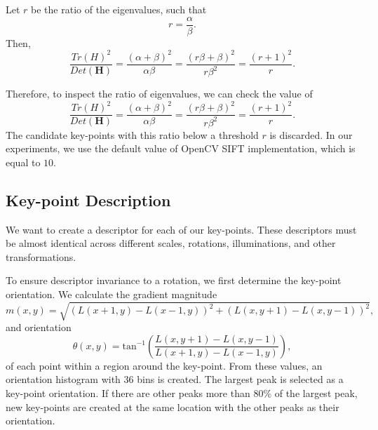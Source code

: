Let $r$ be the ratio of the eigenvalues, such that
\begin{equation}
    r=\frac{\alpha}{\beta}.
\end{equation}
Then,
\begin{equation}
    \frac{Tr(H)^2}{Det(\boldsymbol{H})} = \frac{(\alpha+\beta)^2}{\alpha\beta}=\frac{(r\beta+\beta)^2}{r\beta^2} = \frac{(r+1)^2}{r}.
\end{equation}

Therefore, to inspect the ratio of eigenvalues, we can check the value of
\begin{equation}
    \frac{Tr(H)^2}{Det(\boldsymbol{H})} = \frac{(\alpha+\beta)^2}{\alpha\beta}=\frac{(r\beta+\beta)^2}{r\beta^2} = \frac{(r+1)^2}{r}.
\end{equation}
The candidate key-points with this ratio below a threshold $r$ is discarded. In our experiments, we use the default value of OpenCV SIFT implementation, which is equal to $10$.

\subsection{Key-point Description}
We want to create a descriptor for each of our key-points. These descriptors must be almost identical across different scales, rotations, illuminations, and other transformations.

To ensure descriptor invariance to a rotation, we first determine the key-point orientation. We calculate the gradient magnitude
\begin{equation}
    m(x,y) = \sqrt{(L(x+1,y)-L(x-1,y))^2+(L(x,y+1)-L(x,y-1))^2},
\end{equation}
and orientation
\begin{equation}
    \theta(x,y) = \text{tan}^{-1}\left(\frac{L(x,y+1)-L(x,y-1)}{L(x+1,y)-L(x-1,y)}\right),
\end{equation}
of each point within a region around the key-point. From these values, an orientation histogram with $36$ bins is created. The largest peak is selected as a key-point orientation. If there are other peaks more than $80\%$ of the largest peak, new key-points are created at the same location with the other peaks as their orientation.

